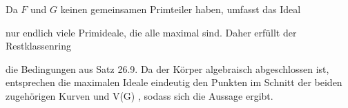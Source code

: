 {


\faktsituation {}



\faktzusatz {}

\faktzusatz {}


}

{


Da $F$ und $G$ keinen gemeinsamen Primteiler haben, umfasst das Ideal

 nur endlich viele Primideale, die alle maximal sind. Daher erfüllt der Restklassenring

 die Bedingungen aus
Satz 26.9.
Da der Körper algebraisch abgeschlossen ist, entsprechen die maximalen Ideale eindeutig den Punkten im Schnitt der beiden zugehörigen Kurven   {  und  }  { V(G)   }{ ,}
sodass sich die Aussage ergibt.


}


